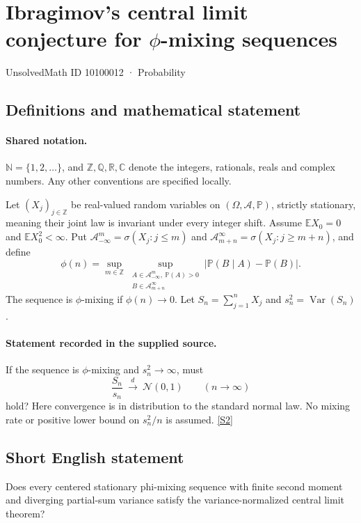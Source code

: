 \documentclass[11pt]{article}
\newcommand{\sref}[2]{\hyperlink{source:#1:#2}{[S#2]}}
\begin{document}
\setcounter{section}{10100011}
\section{Ibragimov's central limit conjecture for \texorpdfstring{$\phi$}{phi}-mixing sequences}\label{10100012}
{\small\sffamily UnsolvedMath ID 10100012 · Probability}
\subsection{Definitions and mathematical statement}

\paragraph{Shared notation.}$\mathbb N=\{1,2,\ldots\}$, and $\mathbb Z,\mathbb Q,\mathbb R,\mathbb C$ denote the integers, rationals, reals and complex numbers. Any other conventions are specified locally.


Let $(X_j)_{j\in\mathbb Z}$ be real-valued random variables on $(\Omega,\mathcal A,\mathbb P)$, strictly stationary, meaning their joint law is invariant under every integer shift. Assume $\mathbb E X_0=0$ and $\mathbb E X_0^2<\infty$. Put $\mathcal A_{-\infty}^{m}=\sigma(X_j:j\le m)$ and $\mathcal A_{m+n}^{\infty}=\sigma(X_j:j\ge m+n)$, and define
\[\phi(n)=\sup_{m\in\mathbb Z}\sup_{\substack{A\in\mathcal A_{-\infty}^{m},\ \mathbb P(A)>0\\B\in\mathcal A_{m+n}^{\infty}}}|\mathbb P(B\mid A)-\mathbb P(B)|.\]
The sequence is $\phi$-mixing if $\phi(n)\to0$. Let $S_n=\sum_{j=1}^n X_j$ and $s_n^2=\operatorname{Var}(S_n)$.
\paragraph{Statement recorded in the supplied source.}
If the sequence is $\phi$-mixing and $s_n^2\to\infty$, must
\[\frac{S_n}{s_n}\ \xrightarrow{\ d\ }\ \mathcal N(0,1)\qquad(n\to\infty)\]
hold? Here convergence is in distribution to the standard normal law. No mixing rate or positive lower bound on $s_n^2/n$ is assumed. \sref{10100012}{2}
\subsection{Short English statement}
Does every centered stationary phi-mixing sequence with finite second moment and diverging partial-sum variance satisfy the variance-normalized central limit theorem?
\end{document}
